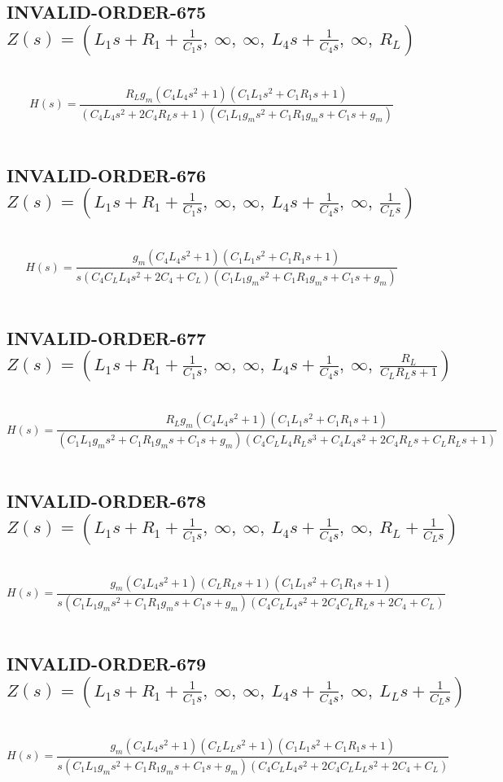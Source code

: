 \documentclass{article}
\begin{document}
\subsection{INVALID-ORDER-675 $Z(s) = \left( L_{1} s + R_{1} + \frac{1}{C_{1} s}, \  \infty, \  \infty, \  L_{4} s + \frac{1}{C_{4} s}, \  \infty, \  R_{L}\right)$ } \ 
\textbf{\[H(s) = \frac{R_{L} g_{m} \left(C_{4} L_{4} s^{2} + 1\right) \left(C_{1} L_{1} s^{2} + C_{1} R_{1} s + 1\right)}{\left(C_{4} L_{4} s^{2} + 2 C_{4} R_{L} s + 1\right) \left(C_{1} L_{1} g_{m} s^{2} + C_{1} R_{1} g_{m} s + C_{1} s + g_{m}\right)}\] } \ 
\subsection{INVALID-ORDER-676 $Z(s) = \left( L_{1} s + R_{1} + \frac{1}{C_{1} s}, \  \infty, \  \infty, \  L_{4} s + \frac{1}{C_{4} s}, \  \infty, \  \frac{1}{C_{L} s}\right)$ } \ 
\textbf{\[H(s) = \frac{g_{m} \left(C_{4} L_{4} s^{2} + 1\right) \left(C_{1} L_{1} s^{2} + C_{1} R_{1} s + 1\right)}{s \left(C_{4} C_{L} L_{4} s^{2} + 2 C_{4} + C_{L}\right) \left(C_{1} L_{1} g_{m} s^{2} + C_{1} R_{1} g_{m} s + C_{1} s + g_{m}\right)}\] } \ 
\subsection{INVALID-ORDER-677 $Z(s) = \left( L_{1} s + R_{1} + \frac{1}{C_{1} s}, \  \infty, \  \infty, \  L_{4} s + \frac{1}{C_{4} s}, \  \infty, \  \frac{R_{L}}{C_{L} R_{L} s + 1}\right)$ } \ 
\textbf{\[H(s) = \frac{R_{L} g_{m} \left(C_{4} L_{4} s^{2} + 1\right) \left(C_{1} L_{1} s^{2} + C_{1} R_{1} s + 1\right)}{\left(C_{1} L_{1} g_{m} s^{2} + C_{1} R_{1} g_{m} s + C_{1} s + g_{m}\right) \left(C_{4} C_{L} L_{4} R_{L} s^{3} + C_{4} L_{4} s^{2} + 2 C_{4} R_{L} s + C_{L} R_{L} s + 1\right)}\] } \ 
\subsection{INVALID-ORDER-678 $Z(s) = \left( L_{1} s + R_{1} + \frac{1}{C_{1} s}, \  \infty, \  \infty, \  L_{4} s + \frac{1}{C_{4} s}, \  \infty, \  R_{L} + \frac{1}{C_{L} s}\right)$ } \ 
\textbf{\[H(s) = \frac{g_{m} \left(C_{4} L_{4} s^{2} + 1\right) \left(C_{L} R_{L} s + 1\right) \left(C_{1} L_{1} s^{2} + C_{1} R_{1} s + 1\right)}{s \left(C_{1} L_{1} g_{m} s^{2} + C_{1} R_{1} g_{m} s + C_{1} s + g_{m}\right) \left(C_{4} C_{L} L_{4} s^{2} + 2 C_{4} C_{L} R_{L} s + 2 C_{4} + C_{L}\right)}\] } \ 
\subsection{INVALID-ORDER-679 $Z(s) = \left( L_{1} s + R_{1} + \frac{1}{C_{1} s}, \  \infty, \  \infty, \  L_{4} s + \frac{1}{C_{4} s}, \  \infty, \  L_{L} s + \frac{1}{C_{L} s}\right)$ } \ 
\textbf{\[H(s) = \frac{g_{m} \left(C_{4} L_{4} s^{2} + 1\right) \left(C_{L} L_{L} s^{2} + 1\right) \left(C_{1} L_{1} s^{2} + C_{1} R_{1} s + 1\right)}{s \left(C_{1} L_{1} g_{m} s^{2} + C_{1} R_{1} g_{m} s + C_{1} s + g_{m}\right) \left(C_{4} C_{L} L_{4} s^{2} + 2 C_{4} C_{L} L_{L} s^{2} + 2 C_{4} + C_{L}\right)}\] } \ 
\end{document}
